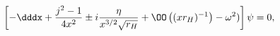 \begin{equation} \label{wave-equation-singularity-corrected}
\left[ -\dddx + \frac{j^2-1}{4x^2} \pm i \frac{\eta}{x^{3/2} \sqrt{r_H}} + \OO\left((x r_H)^{-1}\right) - \omega^2) \right] \psi = 0,
\end{equation}

